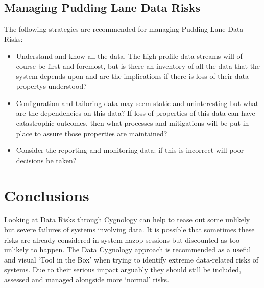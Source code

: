 \subsection{Managing Pudding Lane Data Risks}
The following strategies are recommended for managing Pudding Lane Data Risks:
\begin{itemize}
\item Understand and know all the data.
The high-profile data streams will of course be first and foremost, but is there an inventory of
all the data that the system depends upon and are the implications if there is loss of their \glspl{data property} understood? 
\item Configuration and tailoring data may seem static and uninteresting but what are the
dependencies on this data?
If loss of properties of this data can have catastrophic outcomes,
then what processes and mitigations will be put in place to assure those properties are maintained?
\item Consider the reporting and monitoring data: if this is incorrect will poor decisions be taken?
\end{itemize}

\section{Conclusions}
Looking at Data Risks through Cygnology can help to tease out some unlikely but severe failures of systems involving data. It is possible that sometimes these risks are already considered in system \gls{hazop} sessions but discounted as too unlikely to happen. The Data Cygnology approach is recommended as a useful and visual ‘Tool in the Box’ when trying to identify extreme data-related risks of systems.
Due to their serious impact arguably they should still be included, assessed and managed alongside more ‘normal’ risks.

